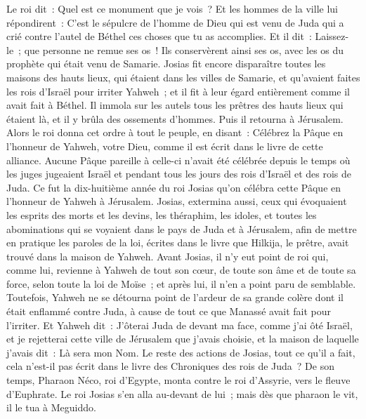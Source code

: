 \begin{multicols}{2}
Le roi dit~: Quel est ce monument que je vois~? Et les hommes de la ville lui répondirent~: C'est le sépulcre de l'homme de Dieu qui est venu de Juda qui a crié contre l'autel de Béthel ces choses que tu as accomplies.
Et il dit~: Laissez-le~; que personne ne remue ses os~! Ils conservèrent ainsi ses os, avec les os du prophète qui était venu de Samarie.
Josias fit encore disparaître toutes les maisons des hauts lieux, qui étaient dans les villes de Samarie, et qu'avaient faites les rois d'Israël pour irriter Yahweh~; et il fit à leur égard entièrement comme il avait fait à Béthel.
Il immola sur les autels tous les prêtres des hauts lieux qui étaient là, et il y brûla des ossements d'hommes. Puis il retourna à Jérusalem.
Alors le roi donna cet ordre à tout le peuple, en disant~: Célébrez la Pâque en l'honneur de Yahweh, votre Dieu, comme il est écrit dans le livre de cette alliance.
Aucune Pâque pareille à celle-ci n'avait été célébrée depuis le temps où les juges jugeaient Israël et pendant tous les jours des rois d'Israël et des rois de Juda.
Ce fut la dix-huitième année du roi Josias qu'on célébra cette Pâque en l'honneur de Yahweh à Jérusalem.
Josias, extermina aussi, ceux qui évoquaient les esprits des morts et les devins, les théraphim, les idoles, et toutes les abominations qui se voyaient dans le pays de Juda et à Jérusalem, afin de mettre en pratique les paroles de la loi, écrites dans le livre que Hilkija, le prêtre, avait trouvé dans la maison de Yahweh.
Avant Josias, il n'y eut point de roi qui, comme lui, revienne à Yahweh de tout son cœur, de toute son âme et de toute sa force, selon toute la loi de Moïse~; et après lui, il n'en a point paru de semblable.
Toutefois, Yahweh ne se détourna point de l'ardeur de sa grande colère dont il était enflammé contre Juda, à cause de tout ce que Manassé avait fait pour l'irriter.
Et Yahweh dit~: J'ôterai Juda de devant ma face, comme j'ai ôté Israël, et je rejetterai cette ville de Jérusalem que j'avais choisie, et la maison de laquelle j'avais dit~: Là sera mon Nom.
Le reste des actions de Josias, tout ce qu'il a fait, cela n'est-il pas écrit dans le livre des Chroniques des rois de Juda~?
De son temps, Pharaon Néco, roi d'Egypte, monta contre le roi d'Assyrie, vers le fleuve d'Euphrate. Le roi Josias s'en alla au-devant de lui~; mais dès que pharaon le vit, il le tua à Meguiddo.

\end{multicols}
